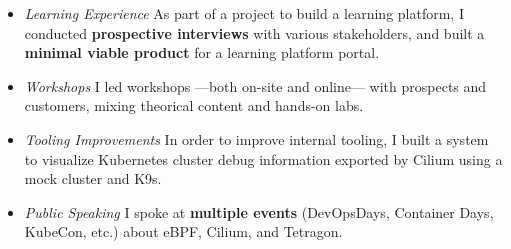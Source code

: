 \documentclass[11pt,a4paper,nolmodern]{moderncv}
\begin{document}
{\begin{itemize}
    \item \emph{Learning Experience}\newline
      As part of a project to build a learning platform, I conducted \textbf{prospective interviews}
      with various stakeholders, and built a \textbf{minimal viable product} for a learning platform portal.
    \item \emph{Workshops}\newline
      I led workshops —both on-site and online— with prospects and customers,
      mixing theorical content and hands-on labs.
    \item \emph{Tooling Improvements}\newline
      In order to improve internal tooling, I built a system to visualize Kubernetes cluster debug information
      exported by Cilium using a mock cluster and K9s.
    \item \emph{Public Speaking}\newline
      I spoke at \textbf{multiple events} (DevOpsDays, Container Days, KubeCon, etc.) about eBPF,
      Cilium, and Tetragon.
  \end{itemize}
          }
\end{document}
